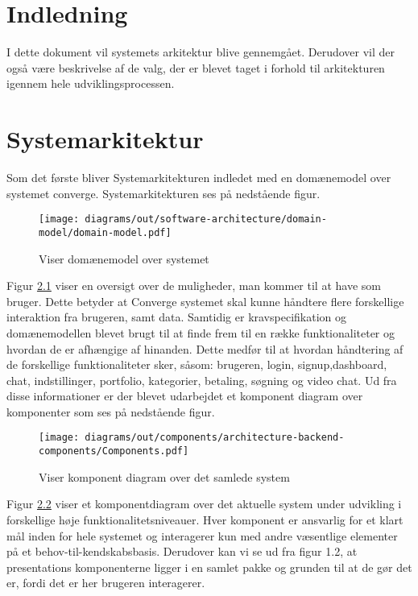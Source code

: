
\chapter{Indledning}

I dette dokument vil systemets arkitektur blive gennemgået. 
Derudover vil der også være beskrivelse af de valg, der er blevet taget i forhold til arkitekturen igennem hele udviklingsprocessen. 
    
\chapter{Systemarkitektur}

Som det første bliver Systemarkitekturen indledet med en domænemodel over systemet converge. Systemarkitekturen ses på nedstående figur.

\begin{figure}[H]
    \centering
\texttt{[image: diagrams/out/software-architecture/domain-model/domain-model.pdf]}
\caption{Viser domænemodel over systemet}
\label{fig:domainmodel}
\end{figure}

Figur \ref{fig:domainmodel} viser en oversigt over de muligheder, man kommer til at have som bruger. Dette betyder at Converge systemet skal kunne håndtere flere forskellige interaktion fra brugeren, samt data. 
Samtidig er kravspecifikation og domænemodellen blevet brugt til at finde frem til en række funktionaliteter og hvordan de er afhængige af hinanden. Dette medfør til at hvordan håndtering af de forskellige funktionaliteter sker, såsom: brugeren, login, signup,dashboard, chat, indstillinger, portfolio, kategorier, betaling, søgning og video chat. Ud fra disse informationer er der blevet udarbejdet et komponent diagram over komponenter som ses på nedstående figur.

\begin{figure}[H]
    \centering
\texttt{[image: diagrams/out/components/architecture-backend-components/Components.pdf]}
\caption{Viser komponent diagram over det samlede system}
\label{fig:komponentdiagram}
\end{figure}

Figur \ref{fig:komponentdiagram} viser et komponentdiagram over det aktuelle system under udvikling i forskellige høje funktionalitetsniveauer. Hver komponent er ansvarlig for et klart mål inden for hele systemet og interagerer kun med andre væsentlige elementer på et behov-til-kendskabsbasis. Derudover kan vi se ud fra figur 1.2, at presentations komponenterne ligger i en samlet pakke og grunden til at de gør det er, fordi det er her brugeren interagerer.


